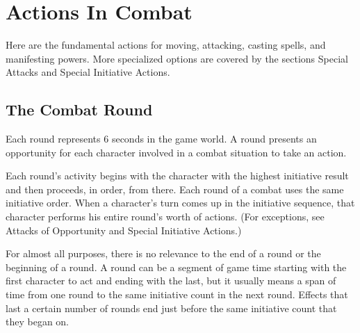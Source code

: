 \section{Actions In Combat}
Here are the fundamental actions for moving, attacking, casting spells, and manifesting powers. More specialized options are covered by the sections Special Attacks and Special Initiative Actions.

\subsection{The Combat Round}
Each round represents 6 seconds in the game world. A round presents an opportunity for each character involved in a combat situation to take an action.

Each round's activity begins with the character with the highest initiative result and then proceeds, in order, from there. Each round of a combat uses the same initiative order. When a character's turn comes up in the initiative sequence, that character performs his entire round's worth of actions. (For exceptions, see Attacks of Opportunity and Special Initiative Actions.)

For almost all purposes, there is no relevance to the end of a round or the beginning of a round. A round can be a segment of game time starting with the first character to act and ending with the last, but it usually means a span of time from one round to the same initiative count in the next round. Effects that last a certain number of rounds end just before the same initiative count that they began on.









\vskip1cm

